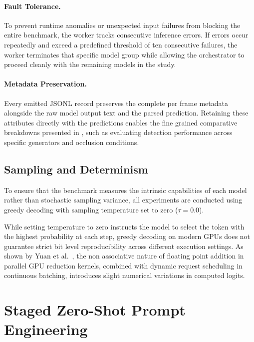 \paragraph{Fault Tolerance.}
To prevent runtime anomalies or unexpected input failures from blocking the entire benchmark, the worker tracks consecutive inference errors. If errors occur repeatedly and exceed a predefined threshold of ten consecutive failures, the worker terminates that specific model group while allowing the orchestrator to proceed cleanly with the remaining models in the study.

\paragraph{Metadata Preservation.}
Every emitted JSONL record preserves the complete per frame metadata alongside the raw model output text and the parsed prediction. Retaining these attributes directly with the predictions enables the fine grained comparative breakdowns presented in , such as evaluating detection performance across specific generators and occlusion conditions.

\subsection{Sampling and Determinism}
\label{subsec:sampling_determinism}

To ensure that the benchmark measures the intrinsic capabilities of each model rather than stochastic sampling variance, all experiments are conducted using greedy decoding with sampling temperature set to zero ($\tau = 0.0$). 

While setting temperature to zero instructs the model to select the token with the highest probability at each step, greedy decoding on modern GPUs does not guarantee strict bit level reproducibility across different execution settings. As shown by Yuan et al.~\cite{yuan2025nondeterminism}, the non associative nature of floating point addition in parallel GPU reduction kernels, combined with dynamic request scheduling in continuous batching, introduces slight numerical variations in computed logits.

\section{Staged Zero-Shot Prompt Engineering}
\label{sec:staged_prompting}

